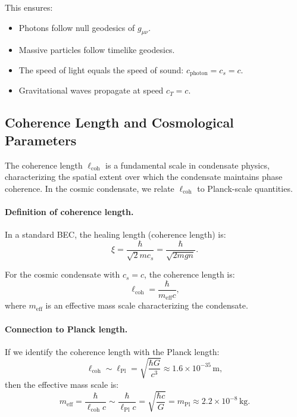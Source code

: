 This ensures:
\begin{itemize}[leftmargin=1.8em]
    \item Photons follow null geodesics of $g_{\mu\nu}$.
    \item Massive particles follow timelike geodesics.
    \item The speed of light equals the speed of sound: $c_{\mathrm{photon}} = c_s = c$.
    \item Gravitational waves propagate at speed $c_T = c$.
\end{itemize}

\subsection{Coherence Length and Cosmological Parameters}
\label{sec:coherence_length}

The coherence length $\ell_{\mathrm{coh}}$ is a fundamental scale in condensate physics, characterizing the spatial extent over which the condensate maintains phase coherence. In the cosmic condensate, we relate $\ell_{\mathrm{coh}}$ to Planck-scale quantities.

\paragraph{Definition of coherence length.}
In a standard BEC, the healing length (coherence length) is:
\begin{equation}
\label{eq:healing_length}
\xi = \frac{\hbar}{\sqrt{2} m c_s} = \frac{\hbar}{\sqrt{2 m g n}}.
\end{equation}

For the cosmic condensate with $c_s = c$, the coherence length is:
\begin{equation}
\label{eq:cosmic_coherence}
\ell_{\mathrm{coh}} = \frac{\hbar}{m_{\mathrm{eff}} c},
\end{equation}
where $m_{\mathrm{eff}}$ is an effective mass scale characterizing the condensate.

\paragraph{Connection to Planck length.}
If we identify the coherence length with the Planck length:
\begin{equation}
\label{eq:lcoh_Planck}
\ell_{\mathrm{coh}} \sim \ell_{\mathrm{Pl}} = \sqrt{\frac{\hbar G}{c^3}} \approx 1.6 \times 10^{-35} \, \mathrm{m},
\end{equation}
then the effective mass scale is:
\begin{equation}
m_{\mathrm{eff}} = \frac{\hbar}{\ell_{\mathrm{coh}} c} \sim \frac{\hbar}{\ell_{\mathrm{Pl}} c} = \sqrt{\frac{\hbar c}{G}} = m_{\mathrm{Pl}} \approx 2.2 \times 10^{-8} \, \mathrm{kg}.
\end{equation}

